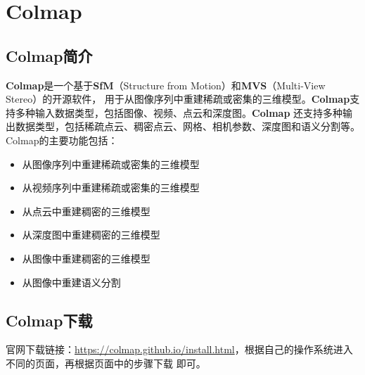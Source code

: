 \documentclass{nwputhesis}
\begin{document}
\makespace
\section{Colmap}
\hypertarget{section 7}{}
\subsection{Colmap简介}
\textbf{Colmap}是一个基于\textbf{SfM}（Structure from Motion）和\textbf{MVS}（Multi-View Stereo）的开源软件，
用于从图像序列中重建稀疏或密集的三维模型。\textbf{Colmap}支持多种输入数据类型，包括图像、视频、点云和深度图。\textbf{Colmap}
还支持多种输出数据类型，包括稀疏点云、稠密点云、网格、相机参数、深度图和语义分割等。Colmap的主要功能包括：
\begin{itemize}
    \item 从图像序列中重建稀疏或密集的三维模型
    \item 从视频序列中重建稀疏或密集的三维模型
    \item 从点云中重建稠密的三维模型
    \item 从深度图中重建稠密的三维模型
    \item 从图像中重建稠密的三维模型
    \item 从图像中重建语义分割
\end{itemize}
\subsection{Colmap下载}
官网下载链接：\url{https://colmap.github.io/install.html}，根据自己的操作系统进入不同的页面，再根据页面中的步骤下载
即可。\\
\end{document}
